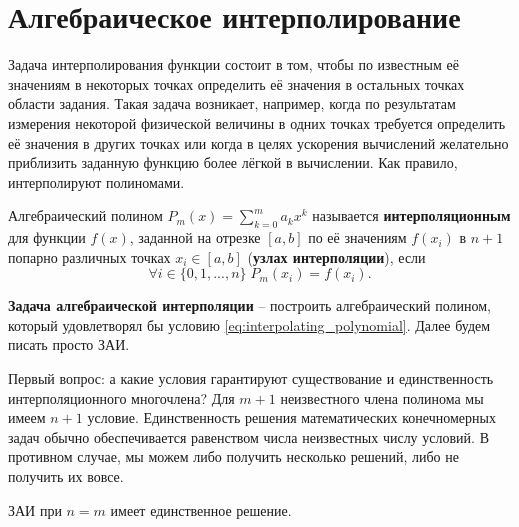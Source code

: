 \documentclass[../main.tex]{subfile}
\begin{document}
\section{Алгебраическое интерполирование}
Задача интерполирования функции состоит в том, чтобы по известным её значениям в
некоторых точках определить её значения в остальных точках области задания.
Такая задача возникает, например, когда по результатам измерения некоторой
физической величины в одних точках требуется определить её значения в других
точках или когда в целях ускорения вычислений желательно приблизить заданную
функцию более лёгкой в вычислении. Как правило, интерполируют полиномами.

\begin{define}\label{eq:interpolating_polynomial}
	Алгебраический полином $P_m(x)=\sum_{k=0}^{m}a_kx^k$ называется
	\textbf{интерполяционным} для функции $f(x)$, заданной на отрезке
	$[a,b]$ по её значениям $f(x_i)$ в $n+1$ попарно различных точках
	$x_i\in[a,b]$ (\textbf{узлах интерполяции}), если
	\[\forall i\in\{0,1,...,n\}\;P_m(x_i)=f(x_i).\]
\end{define}

\begin{define}\label{eq:interpolation_problem}
	\textbf{Задача алгебраической интерполяции} -- построить алгебраический
	полином, который удовлетворял бы условию
	\eqref{eq:interpolating_polynomial}. Далее будем писать просто ЗАИ.
\end{define}

Первый вопрос: а какие условия гарантируют существование и единственность
интерполяционного многочлена? Для $m+1$ неизвестного члена полинома мы имеем
$n+1$ условие. Единственность решения математических конечномерных задач
обычно обеспечивается равенством числа неизвестных числу условий. В противном
случае, мы можем либо получить несколько решений, либо не получить их вовсе.

\begin{theorem}
\label{eq:polynominal_theorem}
	ЗАИ при $n=m$ имеет единственное решение.
\end{theorem}
\end{document}
